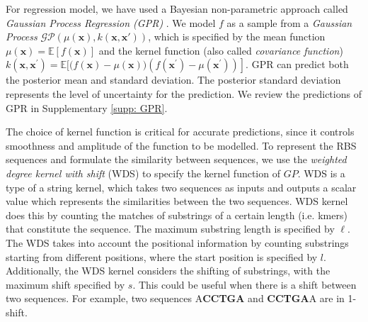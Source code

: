 For regression model, we have used a Bayesian non-parametric approach called \textit{Gaussian Process Regression (GPR)} \cite{Rasmussen2004}.
We model $f$ as a sample from a \textit{Gaussian Process} $\mathcal{G} \mathcal{P}(\mu(\mathbf{x}), k(\mathbf{x}, \mathbf{x'}))$, which is specified by the mean function $\mu(\mathbf{x})=\mathbb{E}[f(\mathbf{x})]$ and the kernel function (also called \textit{covariance function}) $k\left(\mathbf{x}, \mathbf{x}^{\prime}\right)=\mathbb{E}[(f(\mathbf{x})-\left.\mu(\mathbf{x}))\left(f\left(\mathbf{x}^{\prime}\right)-\mu\left(\mathbf{x}^{\prime}\right)\right)\right]$.
GPR can predict both the posterior mean and standard deviation. The posterior standard deviation represents the level of uncertainty for the prediction. 
We review the predictions of GPR in Supplementary \ref{supp: GPR}.


The choice of kernel function is critical for accurate predictions, since it controls smoothness and amplitude of the function to be modelled.
To represent the RBS sequences and formulate the similarity between sequences, we use the \textit{weighted degree kernel with shift} (WDS) \cite{ratsch_rase_2005_wds} to specify the kernel function of $GP$.  
WDS is a type of a string kernel, which takes two sequences as inputs and outputs a scalar value which represents the similarities between the two sequences.  
WDS kernel does this by counting the matches of substrings of a certain length (i.e. kmers) that constitute the sequence.
The maximum substring length is specified by $\ell$. 
The WDS takes into account the positional information by counting substrings starting from different positions, where the start position is specified by $l$.
Additionally, the WDS kernel considers the shifting of substrings, with the maximum shift specified by $s$.
This could be useful when there is a shift between two sequences.
For example, two sequences A\textbf{CCTGA} and \textbf{CCTGA}A are in 1-shift. 

